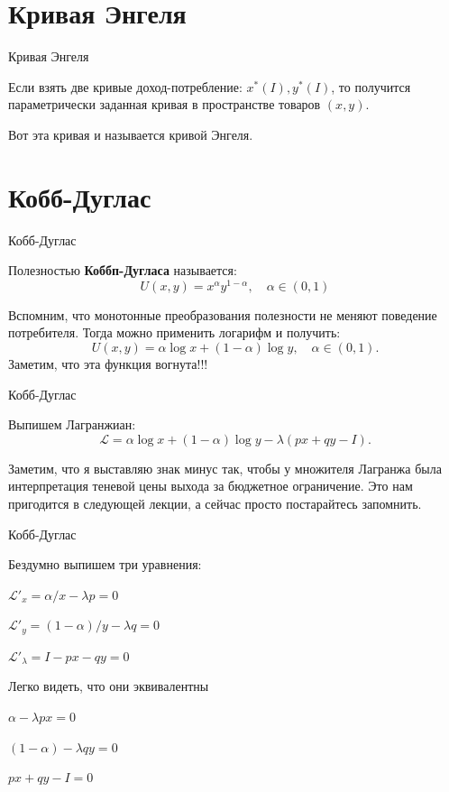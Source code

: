 \documentclass{beamer}
\begin{document}
\section{Кривая Энгеля}

\begin{frame}{Кривая Энгеля}

Если взять две кривые доход-потребление: $x^{\ast}(I), y^{\ast}(I)$, то получится параметрически заданная кривая в пространстве товаров $(x,y)$. 

Вот эта кривая и называется кривой Энгеля.

\end{frame}

\section{Кобб-Дуглас}

\begin{frame}{Кобб-Дуглас}

\begin{definition}
Полезностью \textbf{Коббп-Дугласа} называется:
$$U(x, y) = x^{\alpha} y^{1-\alpha}, \quad \alpha \in (0,1)$$  
\end{definition}

Вспомним, что монотонные преобразования полезности не меняют поведение потребителя. Тогда можно применить логарифм и получить:
$$ U(x, y) = \alpha \log x + (1-\alpha) \log y, \quad \alpha \in (0,1).$$ 
Заметим, что эта функция вогнута!!! 
\end{frame}

\begin{frame}{Кобб-Дуглас}

Выпишем Лагранжиан:
$$ \mathcal{L} = \alpha \log x + (1-\alpha) \log y - \lambda (px + qy -I).$$ 

Заметим, что я выставляю знак минус так, чтобы у множителя Лагранжа была интерпретация теневой цены выхода за бюджетное ограничение. Это нам пригодится в следующей лекции, а сейчас просто постарайтесь запомнить.
\end{frame}

\begin{frame}{Кобб-Дуглас}

Бездумно выпишем три уравнения:

$\mathcal{L}'_x = \alpha/ x - \lambda p = 0$

$\mathcal{L}'_y = (1-\alpha)/y - \lambda q = 0$

$\mathcal{L}'_{\lambda} = I - p x - qy = 0$

Легко видеть, что они эквивалентны

$\alpha - \lambda p x= 0$

$(1-\alpha) - \lambda q y= 0$

$px + qy - I = 0$

\end{frame}
\end{document}
